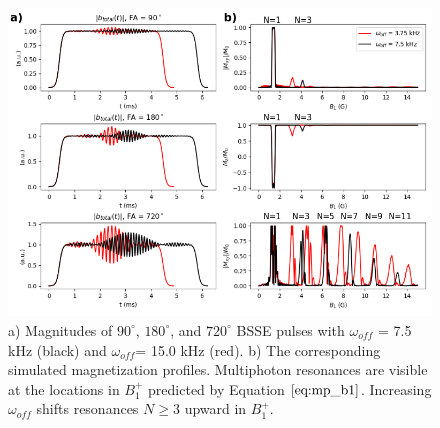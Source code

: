 \documentclass{article}
\begin{document}
\begin{figure}[h]
\centering
\includegraphics[width=1.1\textwidth]{figures/multiphoton_processed.png}
\caption{a) Magnitudes of $90^\circ$, $180^\circ$, and $720^\circ$ BSSE pulses with $\omega_{off}$ = 7.5 kHz (black) and $\omega_{off}$= 15.0 kHz (red). 
b) The corresponding simulated magnetization profiles. 
Multiphoton resonances are visible at the locations in $B_1^+$ predicted by Equation $\ref{eq:mp_b1}$. 
Increasing $\omega_{off}$ shifts resonances $N \geq 3$ upward in $B_1^+$.}
\label{fig:multiphoton}
\end{figure}

\end{document}
